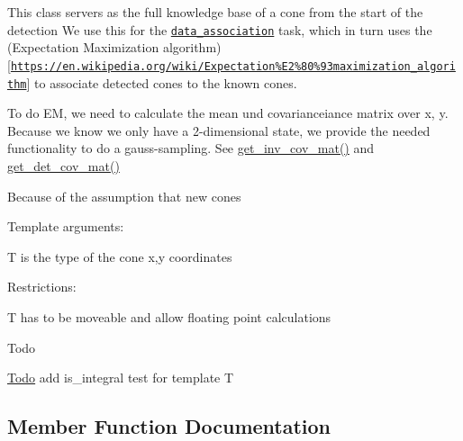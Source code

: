 This class servers as the full knowledge base of a cone from the start of the detection We use this for the \href{data_association.h}{\tt data\+\_\+association} task, which in turn uses the (Expectation Maximization algorithm)\mbox{[}\href{https://en.wikipedia.org/wiki/Expectation%E2%80%93maximization_algorithm}{\tt https\+://en.\+wikipedia.\+org/wiki/\+Expectation\%\+E2\%80\%93maximization\+\_\+algorithm}\mbox{]} to associate detected cones to the known cones.

To do EM, we need to calculate the mean und covarianceiance matrix over {\ttfamily x, y}. Because we know we only have a 2-\/dimensional state, we provide the needed functionality to do a gauss-\/sampling. See {\ttfamily \hyperlink{classclara_1_1cone__state_a7a0584b86ba125a2c232f26d4d1e4a38}{get\+\_\+inv\+\_\+cov\+\_\+mat()}} and {\ttfamily \hyperlink{classclara_1_1cone__state_a5775993f75df93a3121c1fb53ef48777}{get\+\_\+det\+\_\+cov\+\_\+mat()}}

Because of the assumption that new cones

Template arguments\+:
\begin{DoxyItemize}
\item {\ttfamily T} is the type of the cone x,y coordinates
\end{DoxyItemize}

Restrictions\+:
\begin{DoxyItemize}
\item {\ttfamily T} has to be moveable and allow floating point calculations
\end{DoxyItemize}

\begin{DoxyRefDesc}{Todo}
\item[\hyperlink{todo__todo000003}{Todo}]add {\ttfamily is\+\_\+integral} test for template {\ttfamily T} \end{DoxyRefDesc}


\subsection{Member Function Documentation}
\mbox{\label{classclara_1_1cone__state_aee0e3d2bf97a5b06b8a052bf4c93f6ed}} 
